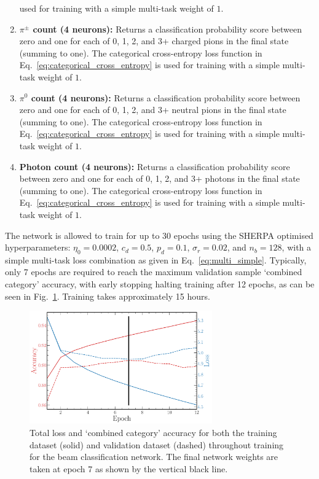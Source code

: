 \begin{enumerate}
          used for training with a simple multi-task weight of $1$.
    \item \textbf{$\pi^{\pm}$ count (4 neurons):} Returns a classification probability score
          between zero and one for each of 0, 1, 2, and 3+ charged pions in the final state
          (summing to one). The categorical cross-entropy loss function in
          Eq.~\ref{eq:categorical_cross_entropy} is used for training with a simple multi-task
          weight of $1$.
    \item \textbf{$\pi^{0}$ count (4 neurons):} Returns a classification probability score between
          zero and one for each of 0, 1, 2, and 3+ neutral pions in the final state (summing to
          one). The categorical cross-entropy loss function in
          Eq.~\ref{eq:categorical_cross_entropy} is used for training with a simple multi-task
          weight of $1$.
    \item \textbf{Photon count (4 neurons):} Returns a classification probability score between
          zero and one for each of 0, 1, 2, and 3+ photons in the final state (summing to one).
          The categorical cross-entropy loss function in Eq.~\ref{eq:categorical_cross_entropy} is
          used for training with a simple multi-task weight of $1$.
\end{enumerate}

The network is allowed to train for up to 30 epochs using the SHERPA optimised hyperparameters:
$\eta_{0}=0.0002$, $c_{d}=0.5$, $p_{d}=0.1$, $\sigma_{r}=0.02$, and $n_{b}=128$, with a simple
multi-task loss combination as given in Eq.~\ref{eq:multi_simple}. Typically, only 7 epochs are
required to reach the maximum validation sample `combined category' accuracy, with early stopping
halting training after 12 epochs, as can be seen in Fig.~\ref{fig:final_beam_history}. Training
takes approximately 15 hours.

\begin{figure} %
    \includegraphics[width=0.7\textwidth]{diagrams/6-cvn/chipsnet/final_beam_history.pdf}
    \caption[Loss and accuracy throughout training for the beam classification network.]
    {Total loss and `combined category' accuracy for both the training dataset (solid) and
        validation dataset (dashed) throughout training for the beam classification network. The
        final network weights are taken at epoch 7 as shown by the vertical black line.}
    \label{fig:final_beam_history}
\end{figure}

